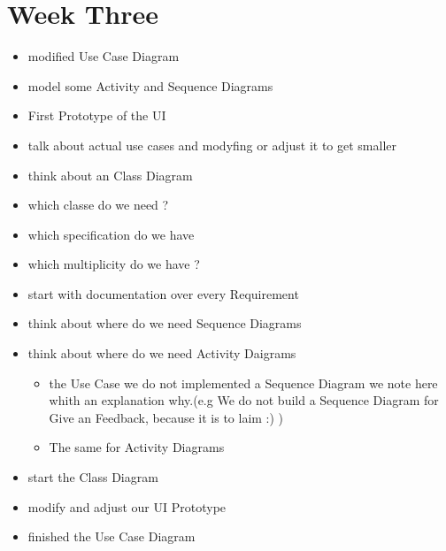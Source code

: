 \documentclass[a4paper, 12pt]{article}
\begin{document}
\section{Week Three}
\begin{itemize}
\item modified Use Case Diagram 
\item model some Activity and Sequence Diagrams 
\item First Prototype of the UI
\item talk about actual use cases and modyfing or adjust it to get smaller
\item think about an Class Diagram
\item which classe do we need ?
\item which specification do we have 
\item which multiplicity do we have ?
\item start with documentation over every Requirement
\item think about where do we need Sequence Diagrams 
\item think about where do we need Activity Daigrams
	\begin{itemize}
		\item the Use Case we do not implemented a Sequence Diagram we note here whith an explanation why.(e.g We do not build a Sequence Diagram for Give an Feedback, because it is to laim :) ) 
		\item The same for Activity Diagrams
	\end{itemize}
\item start the Class Diagram 
\item modify and adjust our UI Prototype
\item finished the Use Case Diagram
\end{itemize}
\end{document}
